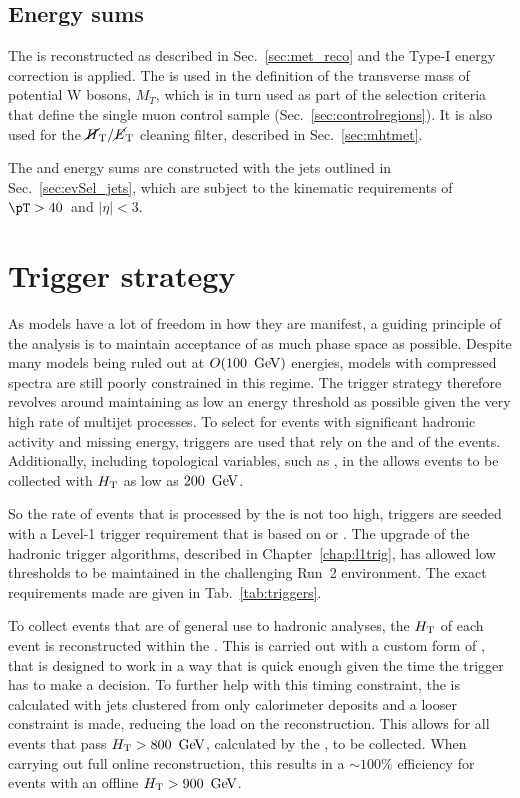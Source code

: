 \subsection{Energy sums}

The \MET is reconstructed as described in
Sec.~\ref{sec:met_reco} and the Type-I \MET energy correction is applied.
The \met is used in the definition of 
the transverse mass of potential W bosons, $M_{T}$, which is in turn used as part of
the selection criteria that define the single muon control sample 
(Sec.~\ref{sec:controlregions}). It is also used for the $\mbox{$\mbox{$\cancel{H}_\text{T}$} / \mbox{$\cancel{E}_\text{T}$}$}$ cleaning
filter, described in Sec.~\ref{sec:mhtmet}.

The \HT and \MHT energy sums are constructed with the jets outlined in
Sec.~\ref{sec:evSel_jets}, which are subject to the kinematic requirements of
$\pT>40$~\gev and $|\eta|<3$.

\section{Trigger strategy}
\label{sec:trigStrat}

As \SUSY models have a lot of freedom in how they are manifest, a
guiding principle of the analysis is to maintain acceptance of as much
phase space as possible. Despite many \SUSY models being ruled out at
$O(100~\mathrm{\,Ge\kern -0.1em V})$ energies, models with compressed spectra are still poorly
constrained in this regime. The trigger strategy therefore revolves
around maintaining as low an energy threshold as possible given the
very high rate of \QCD multijet processes. To select for events with
significant hadronic activity and missing energy, triggers are used
that rely on the \HT and \MHT of the events. Additionally, including
topological variables, such as \alphat, in the \HLT allows events to be
collected with $\mbox{$H_\text{T}$}$ as low as $200~\mathrm{\,Ge\kern -0.1em V}$. 

So the rate of events that is processed by the \HLT is not too high,
\HLT triggers are seeded with a Level-1 trigger requirement that is
based on \HT or \MET. The upgrade of the hadronic trigger algorithms,
described in Chapter~\ref{chap:l1trig}, has allowed low thresholds to
be maintained in the challenging Run~2 environment. The exact
requirements made are given in Tab.~\ref{tab:triggers}.

To collect events that are of general use to hadronic analyses, the
$\mbox{$H_\text{T}$}$ of each event is reconstructed within the \HLT. This is carried
out with a custom form of \PF, that is designed to work in a way that
is quick enough given the time the trigger has to make a decision. To
further help with this timing constraint, the \HT is calculated with
jets clustered from only calorimeter deposits and a looser constraint
is made, reducing the load on the \PF reconstruction. This allows for
all events that pass $\mbox{$H_\text{T}$}>800~\mathrm{\,Ge\kern -0.1em V}$, calculated by the \HLT,
to be collected. When carrying out full online reconstruction, this
results in a $\sim 100\%$ efficiency for events with an offline
$\mbox{$H_\text{T}$}>900~\mathrm{\,Ge\kern -0.1em V}$. 

